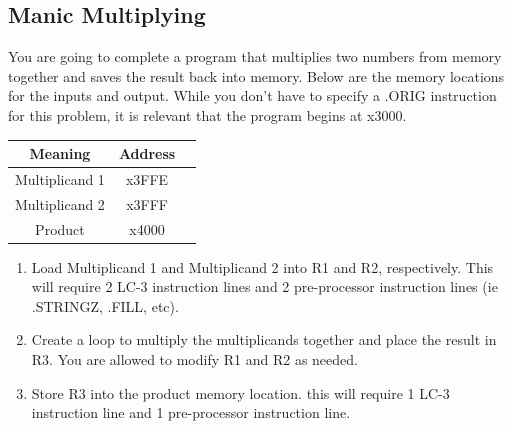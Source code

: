 \documentclass{article}
\begin{document}
\begin{enumerate}[label=(\alph*)]
    \section{Manic Multiplying}
    You are going to complete a program that multiplies two numbers from memory together and saves the result back into memory. Below are the memory locations for the inputs and output. While you don't have to specify a .ORIG instruction for this problem, it is relevant that the program begins at x3000.
    \begin{table}[h]
        \centering
        \begin{tabular}{|c|c|c|}
        \hline
        \textbf{Meaning} & \textbf{Address} \\\hline
        Multiplicand 1 & x3FFE \\\hline
        Multiplicand 2 & x3FFF \\\hline
        Product & x4000 \\
        \hline
        \end{tabular}
        \end{table}
    \begin{enumerate}[label=(\alph*), itemsep = 140pt]
        \item Load Multiplicand 1 and Multiplicand 2 into R1 and R2, respectively. This will require 2 LC-3 instruction lines and 2 pre-processor instruction lines (ie .STRINGZ, .FILL, etc).
        \item Create a loop to multiply the multiplicands together and place the result in R3. You are allowed to modify R1 and R2 as needed.
        \item Store R3 into the product memory location. this will require 1 LC-3 instruction line and 1 pre-processor instruction line.

    \end{enumerate}
    \newpage
    

\end{enumerate}
\end{document}
